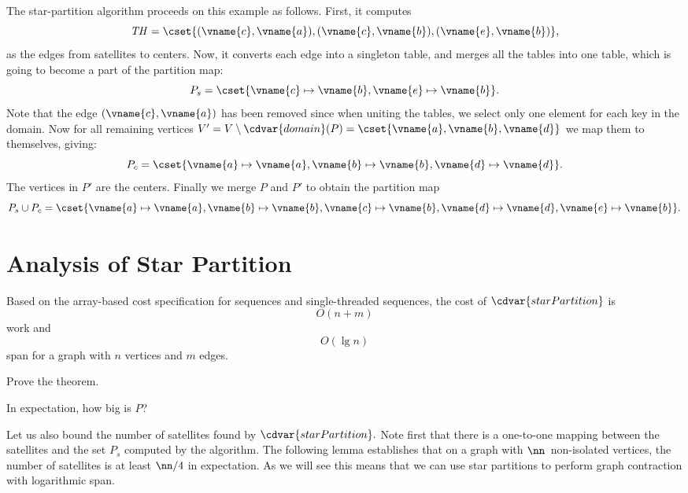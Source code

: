 \begin{group}
\begin{example}
The  star-partition algorithm proceeds on this example as follows.
%
First, it computes
%
\[
\mathit{TH} =
\cset{(\vname{c},\vname{a}),(\vname{c},\vname{b}),(\vname{e},\vname{b})},
\]
%
as the edges from satellites to centers.  
%
Now, it
converts each edge into a singleton table, and merges all the tables
into one
table, which is going to become a part of the partition map:
%
\[
P_s = \cset{\vname{c} \mapsto \vname{b},\vname{e} \mapsto \vname{b}}.
\]
%
Note that the edge $(\vname{c},\vname{a})$ has been removed since when
uniting the tables, we select only one element for each key in the
domain.  
%
Now for all remaining vertices
%
$V' = V \setminus \cdvar{domain}(P) = \cset{\vname{a},\vname{b},\vname{d}}$
we map them to themselves, giving:
%
\[
P_c = \cset{\vname{a} \mapsto \vname{a}, \vname{b} \mapsto \vname{b},
  \vname{d} \mapsto \vname{d}}.
\]
%
The vertices in $P'$ are the centers.
%
Finally we merge $P$ and $P'$ to obtain the partition map
%
\[
P_s \cup P_c = \cset{\vname{a} \mapsto \vname{a}, \vname{b} \mapsto \vname{b}, \vname{c} \mapsto \vname{b}, \vname{d} \mapsto
    \vname{d}, \vname{e} \mapsto \vname{b}}.
\]
\end{example}
\end{group}


\section{Analysis of Star Partition}
\label{sec:graphcon::star::partition-analysis}

\begin{theorem}
Based on the array-based cost specification for sequences and
single-threaded sequences, the cost of $\cdvar{starPartition}$ is 
\[
O(n + m)
\]
work and 
\[
O(\lg n)
\]
span for a graph with $n$ vertices and $m$ edges.
\end{theorem}
\begin{exercise}
Prove the theorem.
\end{exercise}

\begin{teachask}
 In expectation, how big is $P$?  
\end{teachask}


\begin{gram}
Let us also bound the number of satellites found by
$\cdvar{starPartition}.$
%
Note first that there is a one-to-one mapping between the satellites
and the set $P_s$ computed by  the algorithm.
%
%
The following lemma establishes that on a graph with
$\nn$~non-isolated vertices, the number of satellites is at least
$\nn/4$ in expectation.
%
As we will see this means that we can use star partitions to perform
graph contraction with logarithmic span.
\end{gram}

